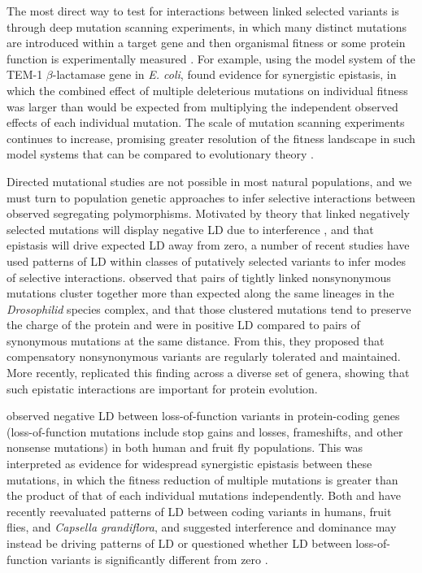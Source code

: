 \documentclass[]{article}
\begin{document}
The most direct way to test for interactions between linked selected variants
is through deep mutation scanning experiments, in which many distinct mutations
are introduced within a target gene and then organismal fitness or some protein
function is experimentally measured \citep{Romero2009-yi, Bank2015-vq,
Puchta2016-rx, Steinberg2016-is}. For example, using the model system of the
TEM-1 \(\beta\)-lactamase gene in \emph{E. coli}, \citet{Bershtein2006-bk}
found evidence for synergistic epistasis, in which the combined effect of
multiple deleterious mutations on individual fitness was larger than would be
expected from multiplying the independent observed effects of each individual
mutation. The scale of mutation scanning experiments continues to increase,
promising greater resolution of the fitness landscape in such model systems
that can be compared to evolutionary theory \citep{Otwinowski2018-zk}.

Directed mutational studies are not possible in most natural populations, and
we must turn to population genetic approaches to infer selective interactions
between observed segregating polymorphisms. Motivated by theory that linked
negatively selected mutations will display negative LD due to interference
\citep{Hill1966-gv}, and that epistasis will drive expected LD away from zero,
a number of recent studies have used patterns of LD within classes of
putatively selected variants to infer modes of selective interactions.
\citet{Callahan2011-ac} observed that pairs of tightly linked nonsynonymous
mutations cluster together more than expected along the same lineages in the
\emph{Drosophilid} species complex, and that those clustered mutations tend to
preserve the charge of the protein and were in positive LD compared to pairs of
synonymous mutations at the same distance. From this, they proposed that
compensatory nonsynonymous variants are regularly tolerated and maintained.
More recently, \citet{Taverner2020-lk} replicated this finding across a diverse
set of genera, showing that such epistatic interactions are important for
protein evolution.

\citet{Sohail2017-zq} observed negative LD between loss-of-function variants in
protein-coding genes (loss-of-function mutations include stop gains and losses,
frameshifts, and other nonsense mutations) in both human and fruit fly
populations. This was interpreted as evidence for widespread synergistic
epistasis between these mutations, in which the fitness reduction of multiple
mutations is greater than the product of that of each individual mutations
independently. Both \citet{Sandler2021-of} and \citet{Garcia2021-zn} have
recently reevaluated patterns of LD between coding variants in humans, fruit
flies, and \emph{Capsella grandiflora}, and suggested interference and
dominance may instead be driving patterns of LD \citep{Garcia2021-zn} or
questioned whether LD between loss-of-function variants is significantly
different from zero \citep{Sandler2021-of}.
\end{document}
